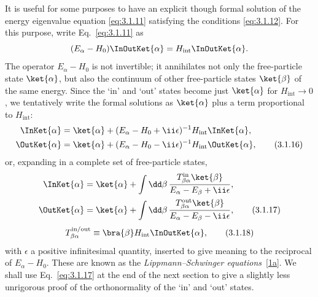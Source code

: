It is useful for some purposes to have an explicit though formal solution of
the energy eigenvalue equation \eqref{eq:3.1.11} satisfying the conditions \eqref{eq:3.1.12}.
For this purpose, write Eq.~\eqref{eq:3.1.11} as
\[
(E_\alpha-H_0)\InOutKet{\alpha}
=H_{\mathrm{int}}\InOutKet{\alpha}.
\]
The operator $E_\alpha-H_0$ is not invertible; it annihilates not only the
free-particle state $\ket{\alpha}$, but also the continuum of other
free-particle states $\ket{\beta}$ of the same energy. Since the `in' and
`out' states become just $\ket{\alpha}$ for $H_{\mathrm{int}}\to0$, we
tentatively write the formal solutions as $\ket{\alpha}$ plus a term
proportional to $H_{\mathrm{int}}$:
\begin{align}
\InKet{\alpha}
&=\ket{\alpha}+(E_\alpha-H_0+\ii\epsilon)^{-1}
H_{\mathrm{int}}\InKet{\alpha},
\notag\\
\OutKet{\alpha}
&=\ket{\alpha}+(E_\alpha-H_0-\ii\epsilon)^{-1}
H_{\mathrm{int}}\OutKet{\alpha},
\tag{3.1.16}\label{eq:3.1.16}
\end{align}
or, expanding in a complete set of free-particle states,
\begin{align}
\InKet{\alpha}
&=\ket{\alpha}+\int \dd\beta\,
\frac{T^{\mathrm{in}}_{\beta\alpha}\ket{\beta}}
{E_\alpha-E_\beta+\ii\epsilon},
\notag\\
\OutKet{\alpha}
&=\ket{\alpha}+\int \dd\beta\,
\frac{T^{\mathrm{out}}_{\beta\alpha}\ket{\beta}}
{E_\alpha-E_\beta-\ii\epsilon},
\tag{3.1.17}\label{eq:3.1.17}
\end{align}
\begin{equation}
T^{\mathrm{in/out}}_{\beta\alpha}
\equiv\bra{\beta}H_{\mathrm{int}}\InOutKet{\alpha},
\tag{3.1.18}\label{eq:3.1.18}
\end{equation}
with $\epsilon$ a positive infinitesimal quantity, inserted to give meaning to
the reciprocal of $E_\alpha-H_0$. These are known as the
\textit{Lippmann--Schwinger equations}~\hyperref[ref:3.1a]{[1a]}. We shall use Eq.~\eqref{eq:3.1.17} at the
end of the next section to give a slightly less unrigorous proof of the
orthonormality of the `in' and `out' states.

